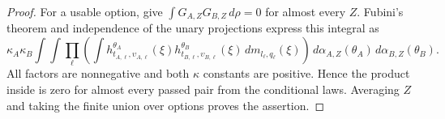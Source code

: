 \begin{proof}
For a usable option, 
give $\int G_{A,Z}G_{B,Z}\,d\rho=0$ for almost every $Z$.
Fubini's theorem and independence of the unary projections express
this integral as
\[
\kappa_A\kappa_B
\int\!\int
 \prod_\ell\left(
  \int h^{\theta_A}_{t_{A,\ell},\upsilon_{A,\ell}}(\xi)
       h^{\theta_B}_{t_{B,\ell},\upsilon_{B,\ell}}(\xi)
                       \,dm_{l_\ell,q_\ell}(\xi)\right)
 \,d\alpha_{A,Z}(\theta_A)\,d\alpha_{B,Z}(\theta_B).
\]
All factors are nonnegative and both $\kappa$ constants are positive.
Hence the product inside is zero for almost every passed pair from
the conditional laws. Averaging $Z$ and taking the finite union over
options proves the assertion.
\end{proof}
